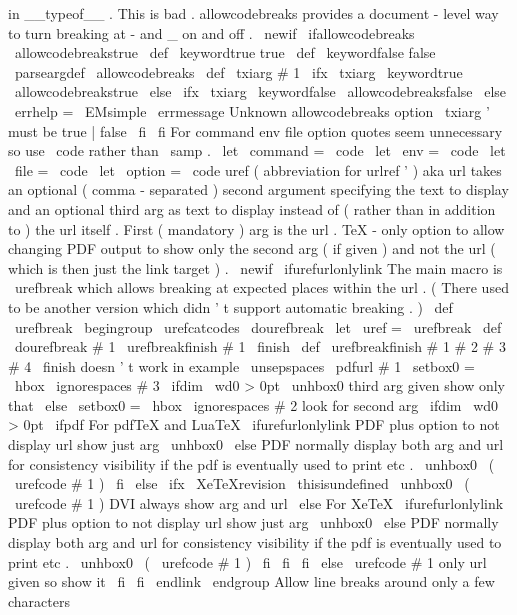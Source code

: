 {{{in
__typeof__
.
This
is
bad
.
%
allowcodebreaks
provides
a
document
-
level
way
to
turn
breaking
at
-
%
and
_
on
and
off
.
%
\
newif
\
ifallowcodebreaks
\
allowcodebreakstrue
\
def
\
keywordtrue
{
true
}
\
def
\
keywordfalse
{
false
}
\
parseargdef
\
allowcodebreaks
{
%
\
def
\
txiarg
{
#
1
}
%
\
ifx
\
txiarg
\
keywordtrue
\
allowcodebreakstrue
\
else
\
ifx
\
txiarg
\
keywordfalse
\
allowcodebreaksfalse
\
else
\
errhelp
=
\
EMsimple
\
errmessage
{
Unknown
allowcodebreaks
option
\
txiarg
'
must
be
true
|
false
}
%
\
fi
\
fi
}
%
For
command
env
file
option
quotes
seem
unnecessary
%
so
use
\
code
rather
than
\
samp
.
\
let
\
command
=
\
code
\
let
\
env
=
\
code
\
let
\
file
=
\
code
\
let
\
option
=
\
code
%
uref
(
abbreviation
for
urlref
'
)
aka
url
takes
an
optional
%
(
comma
-
separated
)
second
argument
specifying
the
text
to
display
and
%
an
optional
third
arg
as
text
to
display
instead
of
(
rather
than
in
%
addition
to
)
the
url
itself
.
First
(
mandatory
)
arg
is
the
url
.
%
TeX
-
only
option
to
allow
changing
PDF
output
to
show
only
the
second
%
arg
(
if
given
)
and
not
the
url
(
which
is
then
just
the
link
target
)
.
\
newif
\
ifurefurlonlylink
%
The
main
macro
is
\
urefbreak
which
allows
breaking
at
expected
%
places
within
the
url
.
(
There
used
to
be
another
version
which
%
didn
'
t
support
automatic
breaking
.
)
\
def
\
urefbreak
{
\
begingroup
\
urefcatcodes
\
dourefbreak
}
\
let
\
uref
=
\
urefbreak
%
\
def
\
dourefbreak
#
1
{
\
urefbreakfinish
#
1
\
finish
}
\
def
\
urefbreakfinish
#
1
#
2
#
3
#
4
\
finish
{
%
doesn
'
t
work
in
example
\
unsepspaces
\
pdfurl
{
#
1
}
%
\
setbox0
=
\
hbox
{
\
ignorespaces
#
3
}
%
\
ifdim
\
wd0
>
0pt
\
unhbox0
%
third
arg
given
show
only
that
\
else
\
setbox0
=
\
hbox
{
\
ignorespaces
#
2
}
%
look
for
second
arg
\
ifdim
\
wd0
>
0pt
\
ifpdf
%
For
pdfTeX
and
LuaTeX
\
ifurefurlonlylink
%
PDF
plus
option
to
not
display
url
show
just
arg
\
unhbox0
\
else
%
PDF
normally
display
both
arg
and
url
for
consistency
%
visibility
if
the
pdf
is
eventually
used
to
print
etc
.
\
unhbox0
\
(
\
urefcode
{
#
1
}
)
%
\
fi
\
else
\
ifx
\
XeTeXrevision
\
thisisundefined
\
unhbox0
\
(
\
urefcode
{
#
1
}
)
%
DVI
always
show
arg
and
url
\
else
%
For
XeTeX
\
ifurefurlonlylink
%
PDF
plus
option
to
not
display
url
show
just
arg
\
unhbox0
\
else
%
PDF
normally
display
both
arg
and
url
for
consistency
%
visibility
if
the
pdf
is
eventually
used
to
print
etc
.
\
unhbox0
\
(
\
urefcode
{
#
1
}
)
%
\
fi
\
fi
\
fi
\
else
\
urefcode
{
#
1
}
%
only
url
given
so
show
it
\
fi
\
fi
\
endlink
\
endgroup
}
%
Allow
line
breaks
around
only
a
few
characters
}}}
